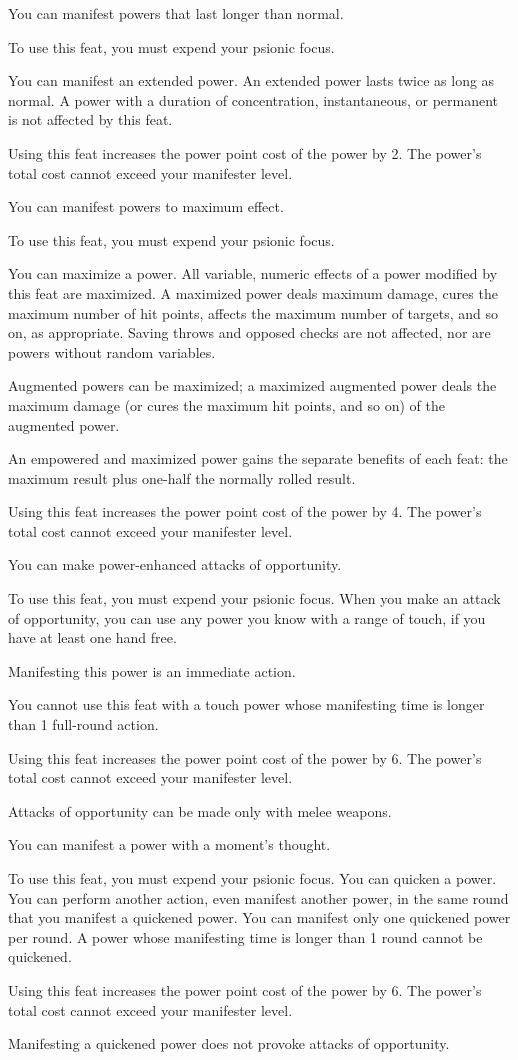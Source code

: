 {You can manifest powers that last longer than normal.}
{}
{To use this feat, you must expend your psionic focus.

You can manifest an extended power. An extended power lasts twice as long as normal. A power with a duration of concentration, instantaneous, or permanent is not affected by this feat.

Using this feat increases the power point cost of the power by 2. The power's total cost cannot exceed your manifester level.}{}{}

{You can manifest powers to maximum effect.}
{}
{To use this feat, you must expend your psionic focus.

You can maximize a power. All variable, numeric effects of a power modified by this feat are maximized. A maximized power deals maximum damage, cures the maximum number of hit points, affects the maximum number of targets, and so on, as appropriate. Saving throws and opposed checks are not affected, nor are powers without random variables.

Augmented powers can be maximized; a maximized augmented power deals the maximum damage (or cures the maximum hit points, and so on) of the augmented power.

An empowered and maximized power gains the separate benefits of each feat: the maximum result plus one-half the normally rolled result.

Using this feat increases the power point cost of the power by 4. The power's total cost cannot exceed your manifester level.}{}{}

{You can make power-enhanced attacks of opportunity.}
{}
{To use this feat, you must expend your psionic focus. When you make an attack of opportunity, you can use any power you know with a range of touch, if you have at least one hand free.

Manifesting this power is an immediate action.

You cannot use this feat with a touch power whose manifesting time is longer than 1 full-round action.

Using this feat increases the power point cost of the power by 6. The power's total cost cannot exceed your manifester level.}
{Attacks of opportunity can be made only with melee weapons.}{}

{You can manifest a power with a moment's thought.}
{}
{To use this feat, you must expend your psionic focus. You can quicken a power. You can perform another action, even manifest another power, in the same round that you manifest a quickened power. You can manifest only one quickened power per round. A power whose manifesting time is longer than 1 round cannot be quickened.

Using this feat increases the power point cost of the power by 6. The power's total cost cannot exceed your manifester level.

Manifesting a quickened power does not provoke attacks of opportunity.}{}{}

